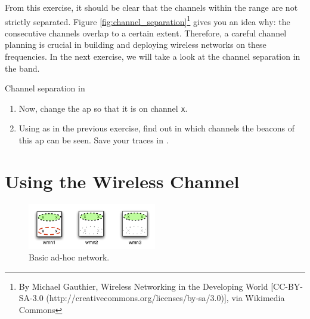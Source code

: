 From this exercise, it should be clear that the channels within the  range are not strictly separated.  Figure \ref{fig:channel_separation}\footnote{By Michael Gauthier, Wireless Networking in the Developing World [CC-BY-SA-3.0 (http://creativecommons.org/licenses/by-sa/3.0)], via Wikimedia Commons} gives you an idea why: the consecutive channels overlap to a certain extent. Therefore, a careful channel planning is crucial in building and deploying wireless networks on these frequencies. In the next exercise, we will take a look at the channel separation in the  band.

\begin{exercise}{Channel separation in }\label{ex:separation}
	
	\begin{enumerate}
		\item Now, change the \ac{ap} so that it is on channel \verb!x!.
		\item Using  as in the previous exercise, find out in which channels  the beacons of this \ac{ap} can be seen. Save your traces in .\newline
		\begin{esolution}
		\end{esolution}
	\end{enumerate}
	
\end{exercise}

\section{Using the Wireless Channel}

\begin{figure}[h]
		\begin{center}
			\includegraphics[width=0.5\textwidth]{images/adhoc2.pdf} 
			\caption{Basic ad-hoc network.}
			\label{fig:ad-hoc2} 
		\end{center}
	\end{figure}
	
